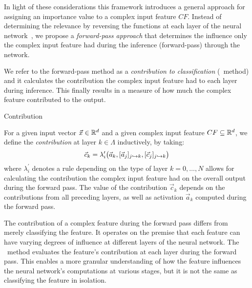 In light of these considerations this framework introduces a general approach for assigning an importance value to a complex input feature $CF$. Instead of determining the relevance by reversing the functions at each layer of the neural network~\cite{ZeilerKTF10, SpringenbergDBR14, SimonyanVZ13, bach2015pixel, LapuschkinBMMS16, ShrikumarGK17, SundararajanTY17}, we propose a \textit{forward-pass approach} that determines the influence only the complex input feature had during the inference (forward-pass) through the network. 

We refer to the forward-pass method as a \emph{contribution to classification} (\CTC\ method) and it calculates the contribution the complex input feature had to each layer during inference. This finally results in a measure of how much the complex feature contributed to the output. 


\begin{Definition}{Contribution}

For a given input vector $\vec{x}\in \mathbb{R}^d$ and a given complex input feature $CF\subseteq \mathbb{R}^d$, we define the \emph{contribution} at layer $k\in \Lambda$ inductively, by taking:
\begin{equation*}
       \vec{c}_k = \lambda^\prime_i\big(\vec{a}_k,[\vec{a}_j]_{j\hookrightarrow k},[\vec{c}_j]_{j\hookrightarrow k}\big)
\end{equation*}
where $\lambda^\prime_i$ denotes a rule depending on the type of layer $k=0,\dots, N$ allows for calculating the contribution the complex input feature had on the overall output during the forward pass. The value of the contribution $\vec{c}_k$ depends on the contributions from all preceding layers, as well as activation $\vec{a}_k$ computed during the forward pass.
\end{Definition}

The contribution of a complex feature during the forward pass differs from merely classifying the feature. It operates on the premise that each feature can have varying degrees of influence at different layers of the neural network. The \CTC\ method evaluates the feature's contribution at each layer during the forward pass. This enables a more granular understanding of how the feature influences the neural network's computations at various stages, but it is not the same as classifying the feature in isolation. 


